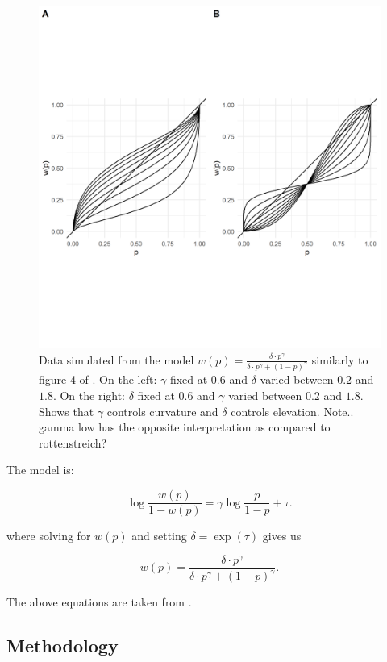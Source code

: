 \documentclass[12pt]{article}
\begin{document}
\begin{figure}[h!]
	\includegraphics[width = \linewidth]{../Figures/grid1.png}
	\caption{Data simulated from the model
		$w(p) = \frac{\delta \cdot p^{\gamma}}
	{\delta \cdot p^{\gamma} +
	(1-p)^{\gamma}}$ similarly to figure 4
	of \textcite{gonzalez1999shape}.
	On the left: $\gamma$ fixed at $0.6$
	and $\delta$ varied between $0.2$ and $1.8$.
	On the right: $\delta$ fixed at $0.6$
	and $\gamma$ varied between $0.2$ and $1.8$.
	Shows that $\gamma$  controls
	curvature and $\delta$ controls
	elevation.
	Note.. gamma low has the opposite interpretation
	as compared to rottenstreich?}
\end{figure}



\vspace{3mm}

The model is:

\[
	\log\frac{w(p)}{1-w(p)} =
	\gamma \log\frac{p}{1-p} + \tau
.\]

where solving for $w(p)$ and setting $\delta = \exp(\tau)$
gives us

\[
	w(p) = \frac{\delta \cdot p^{\gamma}}
	{\delta \cdot p^{\gamma} +
	(1-p)^{\gamma}}
.\]

The above equations are taken from \textcite{
rottenstreich2001money}.

\subsection{Methodology}
\end{document}
